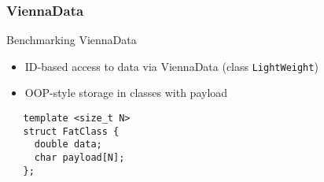 \begin{frame}[fragile]
 \frametitle{ViennaData}

 \begin{block}{Benchmarking ViennaData}
   \begin{itemize}
    \item ID-based access to data via ViennaData (class \lstinline|LightWeight|)
    \item OOP-style storage in classes with payload
   \end{itemize}
 
 \begin{lstlisting}
   template <size_t N>
   struct FatClass {
     double data;
     char payload[N];
   };
 \end{lstlisting}

 \end{block}

\end{frame}


